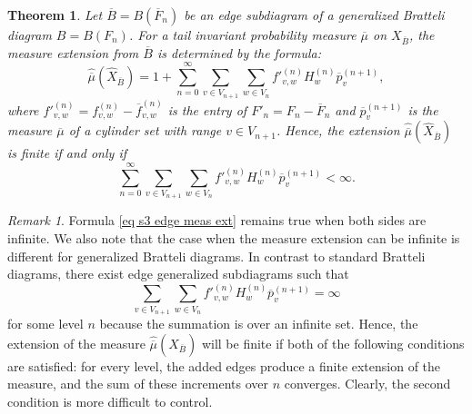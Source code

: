 \documentclass[11pt,reqno]{amsart}
\theoremstyle{definition}
\theoremstyle{remark}
\newtheorem{remark}[definition]{Remark}
\theoremstyle{plain}
\newtheorem{thm}[definition]{Theorem}
\def\ol{\overline}
\newcommand{\be}{\begin{equation}}
\newcommand{\ee}{\end{equation}}
\numberwithin{equation}{section}
\begin{document}
\begin{thm}\label{edge_fin_krit}
Let $\overline{B} =  B(\ol F_n)$ be an edge subdiagram of a generalized Bratteli diagram $B = B(F_n)$. For a tail invariant probability measure $\overline{\mu}$ on $X_{\overline{B}}$, the measure extension from $\ol B$ is determined by the formula:
\be\label{eq s3 edge meas ext}
\widehat{\overline{\mu}}(\widehat{X}_{\overline{B}})  = 1+ 
\sum_{n=0}^\infty \sum_{v\in V_{n+1}} \sum_{w\in V_{n}} {f'}_{v,w}^{(n)} H_w^{(n)} \overline{p}_v^{(n+1)},
\ee
where ${f'}^{(n)}_{v,w} = {f}^{(n)}_{v,w} - \ol{f}^{(n)}_{v,w}$ is the entry of 
$F'_n = F_n - \ol F_n$ and $\overline{p}_v^{(n+1)}$ is the measure
$\ol\mu$ of a cylinder set with range $v \in V_{n+1}$. 
Hence, the extension $\widehat{\overline{\mu}} (\widehat{X}_{\overline{B}})$ is finite if and only if
\begin{equation}\label{eq:edge_sbd_mu_ext}
\sum_{n=0}^{\infty} \sum_{v \in V_{n+1}} \sum_{w \in V_{n}} 
{f'}_{v,w}^{(n)} H_w^{(n)}\overline{p}_v^{(n+1)} < \infty.
\end{equation}
\end{thm}

\begin{remark} Formula \eqref{eq s3 edge meas ext} remains true when both sides are infinite. We also note that the case when the measure extension can be infinite 
is different for generalized Bratteli diagrams. 
In contrast to standard Bratteli diagrams, there exist edge 
generalized subdiagrams such that 
$$
\sum_{v\in V_{n+1}} \sum_{w\in V_{n}} {f'}_{v,w}^{(n)} H_w^{(n)} \overline{p}_v^{(n+1)} = \infty
$$
for some level $n$ because the summation is over an infinite set. Hence, the extension of the measure
$\widehat{\overline{\mu}}(\widehat{X}_{\overline{B}})$ will be finite if both of the following conditions are satisfied: for every level, the added edges produce
a finite extension of the measure, and the sum of these increments over $n$ 
converges. Clearly, the second condition is more difficult to control.
\end{remark}
\end{document}
